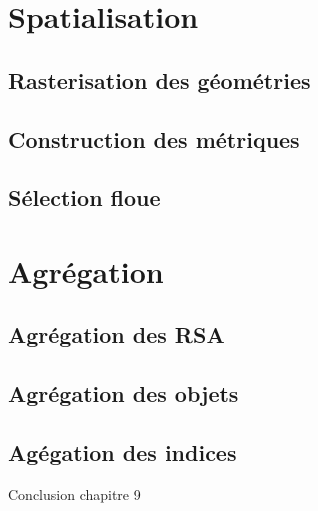 \section{Spatialisation}
\label{sec:9-2}

\subsection{Rasterisation des géométries}
\label{subsec:9-2-1}

\subsection{Construction des métriques}
\label{subsec:9-2-2}

\subsection{Sélection floue}
\label{subsec:9-2-3}

\section{Agrégation}
\label{sec:9-3}

\subsection{Agrégation des RSA}
\label{subsec:9-3-1}

\subsection{Agrégation des objets}
\label{subsec:9-3-2}

\subsection{Agégation des indices}
\label{subsec:9-3-3}


Conclusion chapitre 9


